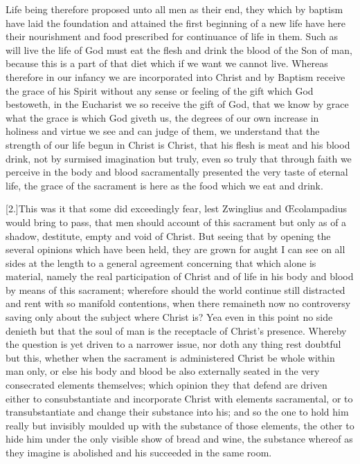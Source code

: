 Life being therefore proposed unto all men as their end, they which by baptism have laid the foundation and attained the first beginning of a new life have here their nourishment and food prescribed for continuance of life in them. Such as will live the life of God must eat the flesh and drink the blood of the Son of man, because this is a part of that diet which if we want we cannot live. Whereas therefore in our infancy we are incorporated into Christ and by Baptism receive the grace of his Spirit without any sense or feeling of the gift which God bestoweth, in the Eucharist we so receive the gift of God, that we know by grace what the grace is which God giveth us, the degrees of our own increase in holiness and virtue we see and can judge of them, we understand that the strength of our life begun in Christ is Christ, that his flesh is meat and his blood drink, not by surmised imagination but truly, even so truly that through faith we perceive in the body and blood sacramentally presented the  very taste of eternal life, the grace of the sacrament is here as the food which we eat and drink.

[2.]This was it that some did exceedingly fear, lest Zwinglius and Œcolampadius would bring to pass, that men should account of this sacrament but only as of a shadow, destitute, empty and void of Christ. But seeing that by opening the several opinions which have been held, they are grown for aught I can see on all sides at the length to a general agreement concerning that which alone is material, namely the real participation of Christ and of life in his body and blood by means of this sacrament; wherefore should the world continue still distracted and rent with so manifold contentions, when there remaineth now no controversy saving only about the subject where Christ is? Yea even in this point no side denieth but that the soul of man is the receptacle of Christ’s presence. Whereby the question is yet driven to a narrower issue, nor doth any thing rest doubtful but this, whether when the sacrament is administered Christ be whole within man only, or else his body and blood be also externally seated in the very consecrated elements themselves; which opinion they that defend are driven either to consubstantiate and incorporate Christ with elements sacramental, or to transubstantiate and change their substance into his; and so the one to hold him really but invisibly moulded up with the substance of those elements, the other to hide him under the only visible show of bread and wine, the substance whereof  as they imagine is abolished and his succeeded in the same room.

